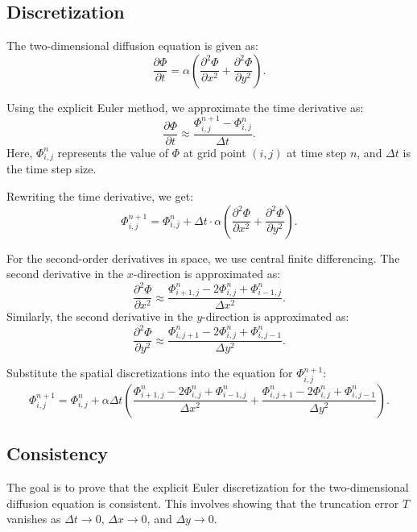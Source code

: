 \documentclass{article}
\begin{document}
\subsection{Discretization}
The two-dimensional diffusion equation is given as:
\begin{equation}
\frac{\partial \Phi}{\partial t} = \alpha \left( \frac{\partial^2 \Phi}{\partial x^2} + \frac{\partial^2 \Phi}{\partial y^2} \right).
\end{equation}

Using the explicit Euler method, we approximate the time derivative as:
\begin{equation}
\frac{\partial \Phi}{\partial t} \approx \frac{\Phi_{i,j}^{n+1} - \Phi_{i,j}^n}{\Delta t}.
\end{equation}
Here, \( \Phi_{i,j}^n \) represents the value of \( \Phi \) at grid point \( (i, j) \) at time step \( n \), and \( \Delta t \) is the time step size.

Rewriting the time derivative, we get:
\begin{equation}
\Phi_{i,j}^{n+1} = \Phi_{i,j}^n + \Delta t \cdot \alpha \left( \frac{\partial^2 \Phi}{\partial x^2} + \frac{\partial^2 \Phi}{\partial y^2} \right).
\end{equation}

For the second-order derivatives in space, we use central finite differencing. The second derivative in the \( x \)-direction is approximated as:
\begin{equation}
\frac{\partial^2 \Phi}{\partial x^2} \approx \frac{\Phi_{i+1,j}^n - 2\Phi_{i,j}^n + \Phi_{i-1,j}^n}{\Delta x^2}.
\end{equation}
Similarly, the second derivative in the \( y \)-direction is approximated as:
\begin{equation}
\frac{\partial^2 \Phi}{\partial y^2} \approx \frac{\Phi_{i,j+1}^n - 2\Phi_{i,j}^n + \Phi_{i,j-1}^n}{\Delta y^2}.
\end{equation}

Substitute the spatial discretizations into the equation for \( \Phi_{i,j}^{n+1} \):
\begin{equation}
\Phi_{i,j}^{n+1} = \Phi_{i,j}^n + \alpha \Delta t \left( \frac{\Phi_{i+1,j}^n - 2\Phi_{i,j}^n + \Phi_{i-1,j}^n}{\Delta x^2} + \frac{\Phi_{i,j+1}^n - 2\Phi_{i,j}^n + \Phi_{i,j-1}^n}{\Delta y^2} \right).
\end{equation}

\subsection{ Consistency}
The goal is to prove that the explicit Euler discretization for the two-dimensional diffusion equation is consistent. This involves showing that the truncation error \( T \) vanishes as \( \Delta t \to 0 \), \( \Delta x \to 0 \), and \( \Delta y \to 0 \).
\end{document}
